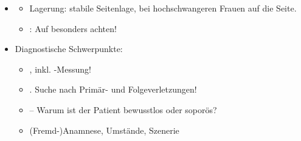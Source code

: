 \label{m:bewusstlosigkeit}
\label{proc:MR40021B}
\begin{itemize}
  \item \TxMassVitMKBes
  \begin{itemize}
    \item Lagerung: stabile Seitenlage, bei hochschwangeren Frauen auf die
     Seite.
    \item {}: Auf 
    besonders achten!
  \end{itemize}
  \item Diagnostische Schwerpunkte:
  \begin{itemize}
    \item {}, inkl. -Messung!
    \item {}. Suche nach Primär- und
    Folgeverletzungen!
    \item {} -- Warum ist der Patient bewusstlos oder
    soporös?
    \item (Fremd-)Anamnese, Umstände, Szenerie
  \end{itemize}
\end{itemize}
